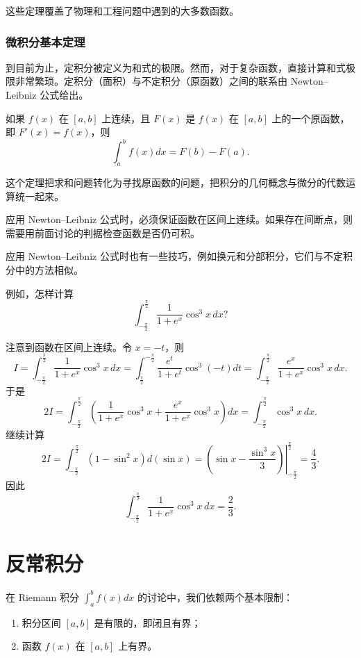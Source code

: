 这些定理覆盖了物理和工程问题中遇到的大多数函数。

\subsubsection{微积分基本定理}

到目前为止，定积分被定义为和式的极限。然而，对于复杂函数，直接计算和式极限非常繁琐。定积分（面积）与不定积分（原函数）之间的联系由 Newton--Leibniz 公式给出。

\begin{theorem}
如果 $f(x)$ 在 $[a,b]$ 上连续，且 $F(x)$ 是 $f(x)$ 在 $[a,b]$ 上的一个原函数，即 $F'(x)=f(x)$，则
\[
\int_a^b f(x)dx=F(b)-F(a).
\]
\end{theorem}

这个定理把求和问题转化为寻找原函数的问题，把积分的几何概念与微分的代数运算统一起来。

应用 Newton--Leibniz 公式时，必须保证函数在区间上连续。如果存在间断点，则需要用前面讨论的判据检查函数是否仍可积。

应用 Newton--Leibniz 公式时也有一些技巧，例如换元和分部积分，它们与不定积分中的方法相似。

例如，怎样计算
\[
\int_{-\frac{\pi}{2}}^{\frac{\pi}{2}}\frac{1}{1+e^x}\cos^3x\,dx?
\]

注意到函数在区间上连续。令 $x=-t$，则
\[
I=\int_{-\frac{\pi}{2}}^{\frac{\pi}{2}}\frac{1}{1+e^x}\cos^3x\,dx
=\int_{\frac{\pi}{2}}^{-\frac{\pi}{2}}\frac{e^t}{1+e^t}\cos^3(-t)dt
=\int_{-\frac{\pi}{2}}^{\frac{\pi}{2}}\frac{e^x}{1+e^x}\cos^3x\,dx.
\]
于是
\[
2I=\int_{-\frac{\pi}{2}}^{\frac{\pi}{2}}\left(\frac{1}{1+e^x}\cos^3x+\frac{e^x}{1+e^x}\cos^3x\right)dx
=\int_{-\frac{\pi}{2}}^{\frac{\pi}{2}}\cos^3x\,dx.
\]
继续计算
\[
2I=\int_{-\frac{\pi}{2}}^{\frac{\pi}{2}}(1-\sin^2x)d(\sin x)=\left.(\sin x-\frac{\sin^3x}{3})\right|_{-\frac{\pi}{2}}^{\frac{\pi}{2}}=\frac{4}{3}.
\]
因此
\[
\int_{-\frac{\pi}{2}}^{\frac{\pi}{2}}\frac{1}{1+e^x}\cos^3x\,dx=\frac{2}{3}.
\]

\section{反常积分}
在 Riemann 积分 $\int_a^b f(x)dx$ 的讨论中，我们依赖两个基本限制：
\begin{enumerate}
    \item 积分区间 $[a,b]$ 是有限的，即闭且有界；
    \item 函数 $f(x)$ 在 $[a,b]$ 上有界。
\end{enumerate}

